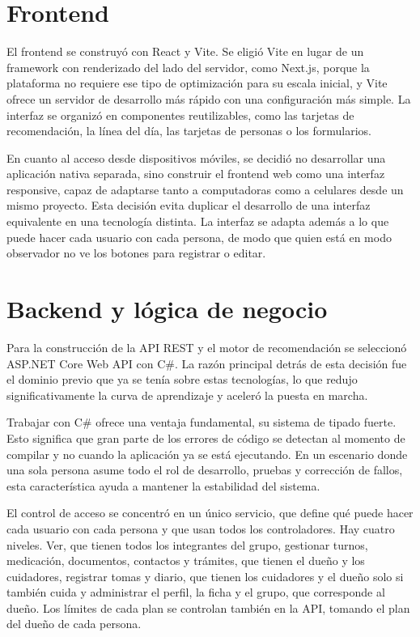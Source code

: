 \section{Frontend}

El frontend se construyó con React y Vite. Se eligió Vite en lugar de un framework con renderizado del lado del servidor, como Next.js, porque la plataforma no requiere ese tipo de optimización para su escala inicial, y Vite ofrece un servidor de desarrollo más rápido con una configuración más simple. La interfaz se organizó en componentes reutilizables, como las tarjetas de recomendación, la línea del día, las tarjetas de personas o los formularios.

En cuanto al acceso desde dispositivos móviles, se decidió no desarrollar una aplicación nativa separada, sino construir el frontend web como una interfaz responsive, capaz de adaptarse tanto a computadoras como a celulares desde un mismo proyecto. Esta decisión evita duplicar el desarrollo de una interfaz equivalente en una tecnología distinta. La interfaz se adapta además a lo que puede hacer cada usuario con cada persona, de modo que quien está en modo observador no ve los botones para registrar o editar.

\section{Backend y lógica de negocio}

Para la construcción de la API REST y el motor de recomendación se seleccionó ASP.NET Core Web API con C\#. La razón principal detrás de esta decisión fue el dominio previo que ya se tenía sobre estas tecnologías, lo que redujo significativamente la curva de aprendizaje y aceleró la puesta en marcha.

Trabajar con C\# ofrece una ventaja fundamental, su sistema de tipado fuerte. Esto significa que gran parte de los errores de código se detectan al momento de compilar y no cuando la aplicación ya se está ejecutando. En un escenario donde una sola persona asume todo el rol de desarrollo, pruebas y corrección de fallos, esta característica ayuda a mantener la estabilidad del sistema.

El control de acceso se concentró en un único servicio, que define qué puede hacer cada usuario con cada persona y que usan todos los controladores. Hay cuatro niveles. Ver, que tienen todos los integrantes del grupo, gestionar turnos, medicación, documentos, contactos y trámites, que tienen el dueño y los cuidadores, registrar tomas y diario, que tienen los cuidadores y el dueño solo si también cuida y administrar el perfil, la ficha y el grupo, que corresponde al dueño. Los límites de cada plan se controlan también en la API, tomando el plan del dueño de cada persona.


